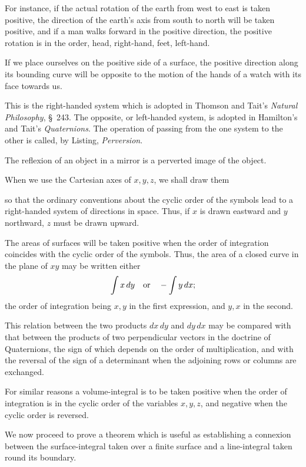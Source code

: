 \documentclass[11pt,a4paper]{article}
\begin{document}
For instance, if the actual rotation of the earth from west to east is
taken positive, the direction of the earth's axis from south to north
will be taken positive, and if a man walks forward in the positive
direction, the positive rotation is in the order, head, right-hand,
feet, left-hand.

If we place ourselves on the positive side of a surface, the positive
direction along its bounding curve will be opposite to the motion of the
hands of a watch with its face towards us.

This is the right-handed system which is adopted in Thomson and Tait's
\textit{Natural Philosophy}, \S~243. The opposite, or left-handed system,
is adopted in Hamilton's and Tait's \textit{Quaternions}. The operation
of passing from the one system to the other is called, by Listing,
\textit{Perversion}.

The reflexion of an object in a mirror is a perverted image of the
object.

When we use the Cartesian axes of \(x,y,z\), we shall draw them

\clearpage

so that the ordinary conventions about the cyclic order of the symbols
lead to a right-handed system of directions in space. Thus, if \(x\) is
drawn eastward and \(y\) northward, \(z\) must be drawn upward.

The areas of surfaces will be taken positive when the order of
integration coincides with the cyclic order of the symbols. Thus, the
area of a closed curve in the plane of \(xy\) may be written either
\[
\int x\,dy\quad\hbox{or}\quad -\int y\,dx;
\]
the order of integration being \(x,y\) in the first expression, and
\(y,x\) in the second.

This relation between the two products \(dx\,dy\) and \(dy\,dx\) may be
compared with that between the products of two perpendicular vectors in
the doctrine of Quaternions, the sign of which depends on the order of
multiplication, and with the reversal of the sign of a determinant when
the adjoining rows or columns are exchanged.

For similar reasons a volume-integral is to be taken positive when the
order of integration is in the cyclic order of the variables \(x,y,z\),
and negative when the cyclic order is reversed.

We now proceed to prove a theorem which is useful as establishing a
connexion between the surface-integral taken over a finite surface and a
line-integral taken round its boundary.
\end{document}
